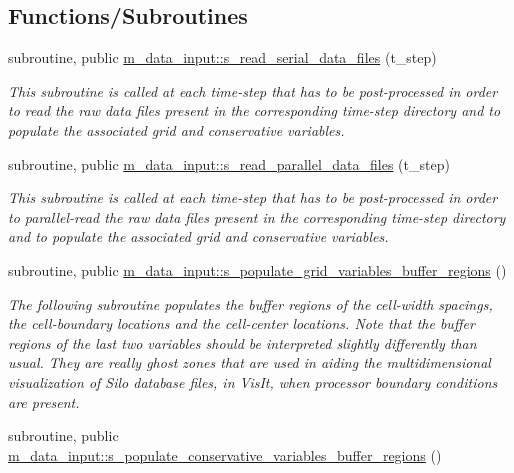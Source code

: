 \subsection*{Functions/\+Subroutines}
\begin{DoxyCompactItemize}
\item 
subroutine, public \hyperlink{namespacem__data__input_a9d69f4bcb771c60157b62bc4b04a6ba1}{m\+\_\+data\+\_\+input\+::s\+\_\+read\+\_\+serial\+\_\+data\+\_\+files} (t\+\_\+step)
\begin{DoxyCompactList}\small\item\em This subroutine is called at each time-\/step that has to be post-\/processed in order to read the raw data files present in the corresponding time-\/step directory and to populate the associated grid and conservative variables. \end{DoxyCompactList}\item 
subroutine, public \hyperlink{namespacem__data__input_a0dd37369dd52b1299b06563f96c25805}{m\+\_\+data\+\_\+input\+::s\+\_\+read\+\_\+parallel\+\_\+data\+\_\+files} (t\+\_\+step)
\begin{DoxyCompactList}\small\item\em This subroutine is called at each time-\/step that has to be post-\/processed in order to parallel-\/read the raw data files present in the corresponding time-\/step directory and to populate the associated grid and conservative variables. \end{DoxyCompactList}\item 
subroutine, public \hyperlink{namespacem__data__input_afc05d7714001946feb2485ce18cb00f6}{m\+\_\+data\+\_\+input\+::s\+\_\+populate\+\_\+grid\+\_\+variables\+\_\+buffer\+\_\+regions} ()
\begin{DoxyCompactList}\small\item\em The following subroutine populates the buffer regions of the cell-\/width spacings, the cell-\/boundary locations and the cell-\/center locations. Note that the buffer regions of the last two variables should be interpreted slightly differently than usual. They are really ghost zones that are used in aiding the multidimensional visualization of Silo database files, in Vis\+It, when processor boundary conditions are present. \end{DoxyCompactList}\item 
subroutine, public \hyperlink{namespacem__data__input_a5cef0da967dbbf0d148b26bd67046c8d}{m\+\_\+data\+\_\+input\+::s\+\_\+populate\+\_\+conservative\+\_\+variables\+\_\+buffer\+\_\+regions} ()

\end{DoxyCompactItemize}
